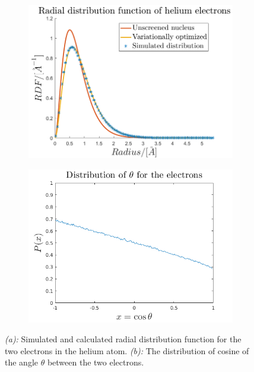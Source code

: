 \begin{figure}[H]
    \centering
    \captionsetup[subfigure]{justification=centering}
    \begin{subfigure}[b]{0.7\textwidth}
        \centering
        \includegraphics[width=\textwidth]{graphics/task1/radius.png}
		\caption{}
		\label{fig:RDF_a}
    \end{subfigure}
    \begin{subfigure}[b]{0.7\textwidth}
        \centering
        \includegraphics[width=\textwidth]{graphics/task1/angle_diff_dist.png}
        \caption{}
		\label{fig:RDF_b}
    \end{subfigure}
    \caption{\textit{(a):} Simulated and calculated radial distribution function for the two electrons in the helium atom. \textit{(b):} The distribution of cosine of the angle $\theta$ between the two electrons.}
    \label{fig:RDF}
\end{figure}

